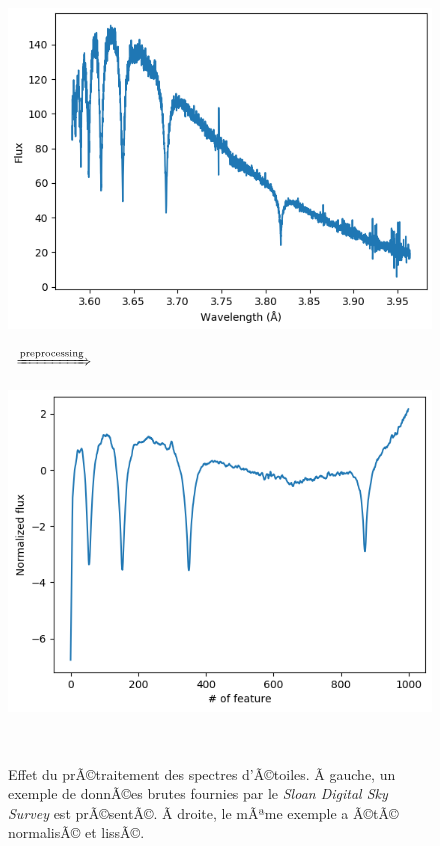 \documentclass{article}
\begin{document}
\begin{figure}[!htb]
 \begin{minipage}{0.45\textwidth}
   \includegraphics[width=\linewidth]{figures/sdss_raw.png}
 \end{minipage}\
 $\xRightarrow{\text{preprocessing}}$
 \begin{minipage}{0.45\textwidth}
   \includegraphics[width=\linewidth]{figures/sdss_norm.png}
 \end{minipage}\
 \caption{Effet du prÃ©traitement des spectres d'Ã©toiles. Ã gauche, un exemple de donnÃ©es brutes fournies par le \textit{Sloan Digital Sky Survey} est prÃ©sentÃ©. Ã droite, le mÃªme exemple a Ã©tÃ© normalisÃ© et lissÃ©.}\label{fig:preprocessing_sdss}
\end{figure}
\end{document}
